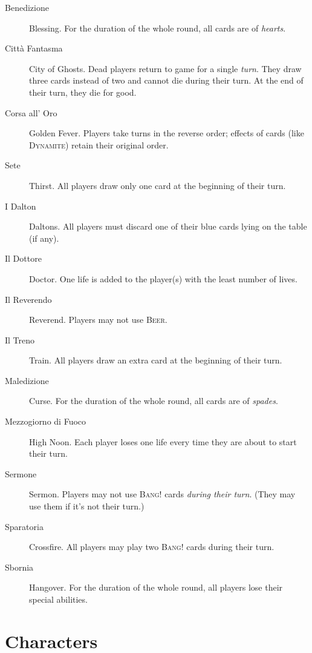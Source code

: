 \documentclass[a4paper,10pt,reqno]{amsart}
\newcommand{\card}[1]{\textsc{#1}}
\newcommand{\col}[1]{\textit{#1}}
\begin{document}
	\begin{description}	
		\item[Benedizione] Blessing. For the duration of the whole round, all cards are of \col{hearts}.
		\item[Città Fantasma] City of Ghosts. Dead players return to game for a single \emph{turn}.
			They draw three cards instead of two and cannot die during their turn. At the end of
			their turn, they die for good.
		\item[Corsa all' Oro] Golden Fever. Players take turns in the reverse order; effects of cards
			(like \card{Dynamite}) retain their original order.
		\item[Sete]	Thirst. All players draw only one card at the beginning of their turn.
		\item[I Dalton] Daltons. All players must discard one of their blue cards lying
			on the table (if any).
		\item[Il Dottore] Doctor. One life is added to the player(s) with the least number of lives.
		\item[Il Reverendo] Reverend. Players may not use \card{Beer}.
		\item[Il Treno] Train. All players draw an extra card at the beginning of their turn.
		\item[Maledizione] Curse. For the duration of the whole round, all cards are of \col{spades}.
		\item[Mezzogiorno di Fuoco] High Noon. Each player loses one life every time they are about to
			start their turn.
		\item[Sermone] Sermon. Players may not use \card{Bang!} cards \emph{during their turn}. (They
			may use them if it's not their turn.)
		\item[Sparatoria] Crossfire. All players may play two \card{Bang!} cards during their turn.
		\item[Sbornia] Hangover. For the duration of the whole round, all players lose their special
			abilities.
	\end{description}
	
	\section*{Characters}
	
\end{document}
